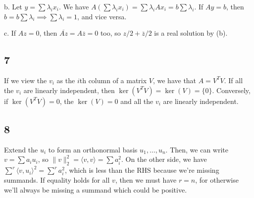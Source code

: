 \documentclass{article}
\newcommand{\conj}{\overline}
\begin{document}
\noindent b. Let $y=\sum\lambda_ix_i$. We have $A(\sum\lambda_ix_i)=\sum\lambda_iAx_i=b\sum\lambda_i$. If $Ay=b$, then $b=b\sum\lambda_i\implies\sum\lambda_i=1$, and vice versa.

\noindent c. If $Az=0$, then $\conj{Az}=A\conj{z}=0$ too, so $z/2+\conj{z}/2$ is a real solution by (b).

\subsection*{7}
If we view the $v_i$ as the $i$th column of a matrix $V$, we have that $A=V^TV$. If all the $v_i$ are linearly independent, then $\ker(V^TV)=\ker(V)=\{0\}$. Conversely, if $\ker(V^TV)=0$, the $\ker(V)=0$ and all the $v_i$ are linearly independent.

\subsection*{8}
Extend the $u_i$ to form an orthonormal basis $u_1,\ldots,u_n$. Then, we can write $v=\sum a_iu_i$, so $\lVert v\rVert_2^2=\langle v,v\rangle=\sum a_i^2$. On the other side, we have $\sum^r\langle v,u_i\rangle^2=\sum^ra_i^2$, which is less than the RHS because we're missing summands. If equality holds for all $v$, then we must have $r=n$, for otherwise we'll always be missing a summand which could be positive.
\end{document}
